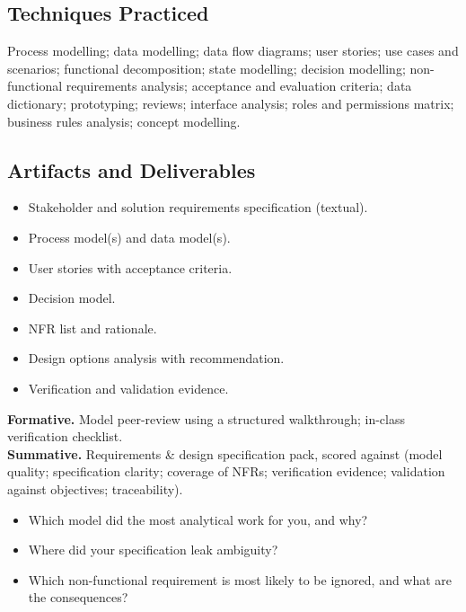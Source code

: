 \documentclass[11pt,letterpaper,oneside]{report}
\begin{document}
\subsection*{Techniques Practiced}
Process modelling; data modelling; data flow diagrams; user stories; use cases and scenarios; functional decomposition; state modelling; decision modelling; non-functional requirements analysis; acceptance and evaluation criteria; data dictionary; prototyping; reviews; interface analysis; roles and permissions matrix; business rules analysis; concept modelling.

\subsection*{Artifacts and Deliverables}
\begin{itemize}
  \item Stakeholder and solution requirements specification (textual).
  \item Process model(s) and data model(s).
  \item User stories with acceptance criteria.
  \item Decision model.
  \item NFR list and rationale.
  \item Design options analysis with recommendation.
  \item Verification and validation evidence.
\end{itemize}

\begin{curriculumassessment}
\textbf{Formative.} Model peer-review using a structured walkthrough; in-class verification checklist.\\[3pt]
\textbf{Summative.} Requirements \& design specification pack, scored against  (model quality; specification clarity; coverage of NFRs; verification evidence; validation against objectives; traceability).
\end{curriculumassessment}

\begin{curriculumreflection}
\begin{itemize}
  \item Which model did the most analytical work for you, and why?
  \item Where did your specification leak ambiguity?
  \item Which non-functional requirement is most likely to be ignored, and what are the consequences?
\end{itemize}
\end{curriculumreflection}
\end{document}
